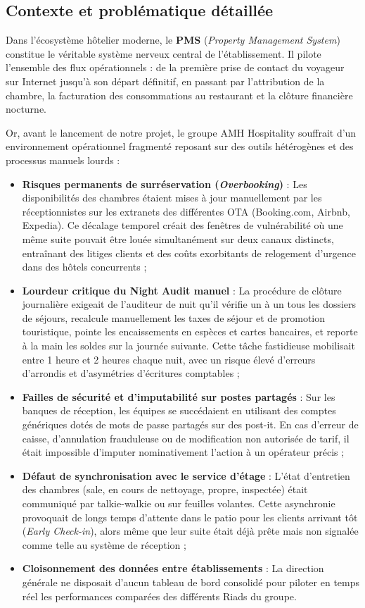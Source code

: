 \subsection{Contexte et problématique détaillée}

Dans l'écosystème hôtelier moderne, le \textbf{PMS} (\textit{Property Management System}) constitue le véritable système nerveux central de l'établissement. Il pilote l'ensemble des flux opérationnels : de la première prise de contact du voyageur sur Internet jusqu'à son départ définitif, en passant par l'attribution de la chambre, la facturation des consommations au restaurant et la clôture financière nocturne.

Or, avant le lancement de notre projet, le groupe AMH Hospitality souffrait d'un environnement opérationnel fragmenté reposant sur des outils hétérogènes et des processus manuels lourds :

\begin{itemize}
    \item \textbf{Risques permanents de surréservation (\textit{Overbooking})} : Les disponibilités des chambres étaient mises à jour manuellement par les réceptionnistes sur les extranets des différentes OTA (Booking.com, Airbnb, Expedia). Ce décalage temporel créait des fenêtres de vulnérabilité où une même suite pouvait être louée simultanément sur deux canaux distincts, entraînant des litiges clients et des coûts exorbitants de relogement d'urgence dans des hôtels concurrents ;
    \item \textbf{Lourdeur critique du Night Audit manuel} : La procédure de clôture journalière exigeait de l'auditeur de nuit qu'il vérifie un à un tous les dossiers de séjours, recalcule manuellement les taxes de séjour et de promotion touristique, pointe les encaissements en espèces et cartes bancaires, et reporte à la main les soldes sur la journée suivante. Cette tâche fastidieuse mobilisait entre 1 heure et 2 heures chaque nuit, avec un risque élevé d'erreurs d'arrondis et d'asymétries d'écritures comptables ;
    \item \textbf{Failles de sécurité et d'imputabilité sur postes partagés} : Sur les banques de réception, les équipes se succédaient en utilisant des comptes génériques dotés de mots de passe partagés sur des post-it. En cas d'erreur de caisse, d'annulation frauduleuse ou de modification non autorisée de tarif, il était impossible d'imputer nominativement l'action à un opérateur précis ;
    \item \textbf{Défaut de synchronisation avec le service d'étage} : L'état d'entretien des chambres (sale, en cours de nettoyage, propre, inspectée) était communiqué par talkie-walkie ou sur feuilles volantes. Cette asynchronie provoquait de longs temps d'attente dans le patio pour les clients arrivant tôt (\textit{Early Check-in}), alors même que leur suite était déjà prête mais non signalée comme telle au système de réception ;
    \item \textbf{Cloisonnement des données entre établissements} : La direction générale ne disposait d'aucun tableau de bord consolidé pour piloter en temps réel les performances comparées des différents Riads du groupe.
\end{itemize}


